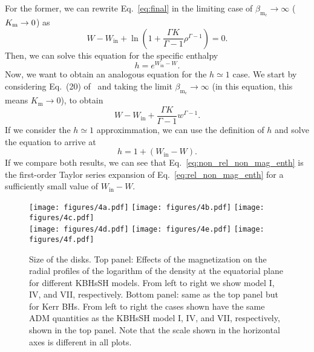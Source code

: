 \documentclass[twocolumn,aps,showpacs,showkeys,prd,superscriptaddress,byrevtex, amsmath]{revtex4-1}
\begin{document}
For the former, we can rewrite Eq.~\eqref{eq:final} in the limiting case of $\beta_{\mathrm{m_c}} \rightarrow \infty$ ($K_{\rm m} \rightarrow 0$) as
\begin{equation}
W - W_{\mathrm{in}} + \ln \left(1 + \frac{\Gamma K}{\Gamma -1}\rho^{\Gamma -1}\right) = 0.
\end{equation}
Then, we can solve this equation for the specific enthalpy
\begin{equation}\label{eq:rel_non_mag_enth}
h = e^{W_{\mathrm{in}} - W}.
\end{equation}
Now, we want to obtain an analogous equation for the $h \simeq 1$ case. We start by considering Eq.~(20) of~\cite{Gimeno-Soler:2017} and taking the limit $\beta_{\mathrm{m_c}} \rightarrow \infty$ (in this equation, this means $K_{\mathrm{m}} \rightarrow 0$), to obtain
\begin{equation}
W - W_{\mathrm{in}} + \frac{\Gamma K}{\Gamma -1}w^{\Gamma -1}.
\end{equation}
If we consider the $h \simeq 1$ approximmation, we can use the definition of $h$ and solve the equation to arrive at
\begin{equation}\label{eq:non_rel_non_mag_enth}
h = 1 + (W_{\mathrm{in}} - W).
\end{equation}
If we compare both results, we can see that Eq.~\eqref{eq:non_rel_non_mag_enth} is the first-order Taylor series expansion of Eq.~\eqref{eq:rel_non_mag_enth} for a sufficiently small value of $W_{\mathrm{in}} - W$.

\begin{figure*}
\centering
\texttt{[image: figures/4a.pdf]}
\hspace{-0.6cm}
\texttt{[image: figures/4b.pdf]}
\hspace{-0.6cm}
\texttt{[image: figures/4c.pdf]}
\hspace{-0.6cm}
\\
\hspace{-0.6cm}
\texttt{[image: figures/4d.pdf]}
\hspace{-0.6cm}
\texttt{[image: figures/4e.pdf]}
\hspace{-0.6cm}
\texttt{[image: figures/4f.pdf]}
\hspace{-0.6cm}
\caption{Size of the disks. Top panel: Effects of the magnetization on the radial profiles of the logarithm of the density at the equatorial plane for different KBHsSH models. From left to right we show model I, IV, and VII, respectively. Bottom panel: same as the top panel but for Kerr BHs. From left to right the cases shown have the same ADM quantities as the KBHsSH model I, IV, and VII, respectively, shown in the top panel. Note that the scale shown in the horizontal axes is different in all plots.}
\label{radial_profiles}
\end{figure*}
\end{document}
